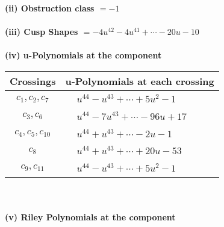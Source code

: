 \documentclass[1p]{elsarticle_modified}
\theoremstyle{definition}
\begin{document}
\flushleft \textbf{(ii) Obstruction class $= -1$}\\~\\
\flushleft \textbf{(iii) Cusp Shapes $= -4 u^{42}-4 u^{41}+\cdots-20 u-10$}\\~\\
\newpage\renewcommand{\arraystretch}{1}
\flushleft \textbf{(iv) u-Polynomials at the component}\newline \\
\begin{tabular}{m{50pt}|m{274pt}}
Crossings & \hspace{64pt}u-Polynomials at each crossing \\
\hline $$\begin{aligned}c_{1},c_{2},c_{7}\end{aligned}$$&$\begin{aligned}
&u^{44}- u^{43}+\cdots+5 u^2-1
\end{aligned}$\\
\hline $$\begin{aligned}c_{3},c_{6}\end{aligned}$$&$\begin{aligned}
&u^{44}-7 u^{43}+\cdots-96 u+17
\end{aligned}$\\
\hline $$\begin{aligned}c_{4},c_{5},c_{10}\end{aligned}$$&$\begin{aligned}
&u^{44}+u^{43}+\cdots-2 u-1
\end{aligned}$\\
\hline $$\begin{aligned}c_{8}\end{aligned}$$&$\begin{aligned}
&u^{44}+u^{43}+\cdots+20 u-53
\end{aligned}$\\
\hline $$\begin{aligned}c_{9},c_{11}\end{aligned}$$&$\begin{aligned}
&u^{44}- u^{43}+\cdots+5 u^2-1
\end{aligned}$\\
\hline
\end{tabular}\\~\\
\newpage\renewcommand{\arraystretch}{1}
\flushleft \textbf{(v) Riley Polynomials at the component}\newline \\
\end{document}
